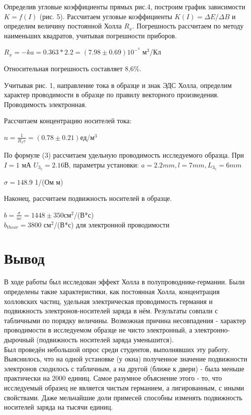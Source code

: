 \documentclass[a4paper]{article}
\begin{document}
Определив угловые коэффициенты прямых рис.4, построим график зависимости $K = f(I)$ (рис. 5). Рассчитаем угловые коэффициенты $K(I) = \Delta E / \Delta B$ и определим величину постоянной Холла $R_x$. Погрешность рассчитаем по методу наименьших квадратов, учитывая погрешности приборов.



\begin{center}
  $R_x = - k a = 0.363 * 2.2 = (7.98 \pm 0.69)10^-^4 $ м$^3$/Кл  
\end{center}

Относительная погрешность составляет 8,6\%.

Учитывая рис. 1, направление тока в образце и знак ЭДС Холла, определим характер проводимости в образце по правилу векторного произведения. Проводимость электронная.

Рассчитаем концентрацию носителей тока:

\begin{center}
    $n = \frac{1}{R_x e} = (0.78 \pm 0.21)$ед/м$^3$
\end{center}

По формуле (3) рассчитаем удельную проводимость исследуемого образца. При $I = 1$ мА $U_3_5 = 2.16 $В, параметры установки: $a = 2.2mm, l = 7 mm, L_3_5 = 6 mm$
 \begin{center}
     $\sigma = 148.9$ 1/(Ом м)
 \end{center}
 
 Наконец, рассчитаем подвижность носителей в образце.
 \begin{center}
     $b = \frac{\sigma}{ne} = 1448 \pm 350 $см$^2$/(В*с) \\
     $b_{theor} = 3800$ см$^2$/(В*с) для электронной проводимости
 \end{center}


\section*{Вывод}

В ходе работы был исследован эффект Холла в полупроводнике-германии. Были определены такие характеристики, как постоянная Холла, концентрация холловских частиц, удельная электрическая проводимость германия и подвижность электронов-носителей заряда в нём. Результаты совпали с табличными по порядку величины. Возможная причина несовпадения - характер проводимости в исследуемом образце не чисто электронный, а электронно-дырочный (подвижность носителей заряда уменьшится). \\
Был проведён небольшой опрос среди студентов, выполнявших эту работу. Выяснилось, что на одной установке (у окна) полученное значение подвижности электронов сходилось с табличным, а на другой (ближе к двери) - была меньше практически на 2000 единиц. Самое разумное объяснение этого - то, что исследуемый образец не является чистым германием, а лигированным, с иными свойствами. Даже мельчайшие доли примесей способны изменять подвижность носителей заряда на тысячи единиц.
\end{document}
